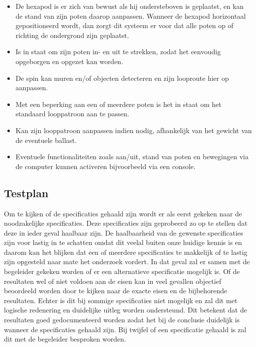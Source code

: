\documentclass[10pt,a4paper]{article}
\begin{document}
\begin{itemize}
\setlength\itemsep{0em}
\item De hexapod is er zich van bewust als hij ondersteboven is geplaatst, en kan de stand van zijn poten daarop aanpassen. Wanneer de hexapod horizontaal gepositioneerd wordt, dan zorgt dit systeem er voor dat alle poten op of richting de ondergrond zijn geplaatst.
\item Is in staat om zijn poten in- en uit te strekken, zodat het eenvoudig opgeborgen en opgezet kan worden.
\item De spin kan muren en/of objecten detecteren en zijn looproute hier op aanpassen. 
\item Met een beperking aan een of meerdere poten is het in staat om het standaard looppatroon aan te passen.
\item Kan zijn looppatroon aanpassen indien nodig, afhankelijk van het gewicht van de eventuele ballast.
\item Eventuele functionaliteiten zoals aan/uit, stand van poten en bewegingen via de computer kunnen activeren bijvoorbeeld via een console.
\end{itemize}

\subsection{Testplan}
Om te kijken of de specificaties gehaald zijn wordt er als eerst gekeken naar de noodzakelijke specificaties. Deze specificaties zijn geprobeerd zo op te stellen dat deze in ieder geval haalbaar zijn. De haalbaarheid van de gewenste specificaties zijn voor lastig in te schatten omdat dit veelal buiten onze huidige kennis is en daarom kan het blijken dat een of meerdere specificaties te makkelijk of te lastig zijn opgesteld naar mate het onderzoek vordert. In dat geval zal er samen met de begeleider gekeken worden of er een alternatieve specificatie mogelijk is.
Of de resultaten wel of niet voldoen aan de eisen kan in veel gevallen objectief beoordeeld worden door te kijken naar de exacte eisen en de bijbehorende resultaten. Echter is dit bij sommige specificaties niet mogelijk en zal dit met logische redenering en duidelijke uitleg worden ondersteund.
Dit betekent dat de resultaten goed gedocumenteerd worden zodat het bij de conclusie duidelijk is wanneer de specificaties gehaald zijn. Bij twijfel of een specificatie gehaald is zal dit met de begeleider besproken worden.
\newpage
\end{document}
